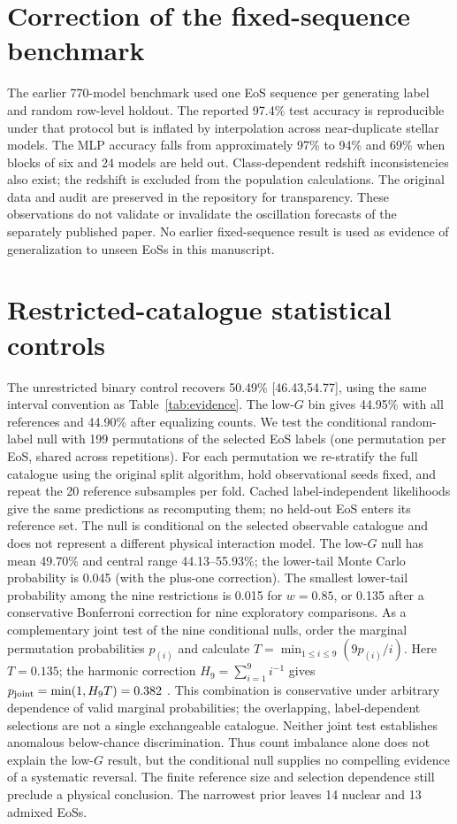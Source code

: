 \documentclass[11pt,a4paper]{article}
\begin{document}
\section{Correction of the fixed-sequence benchmark}\label{sec:legacy}
The earlier 770-model benchmark used one EoS sequence per generating label and random row-level holdout. The reported 97.4\% test accuracy is reproducible under that protocol but is inflated by interpolation across near-duplicate stellar models. The MLP accuracy falls from approximately 97\% to 94\% and 69\% when blocks of six and 24 models are held out. Class-dependent redshift inconsistencies also exist; the redshift is excluded from the population calculations. The original data and audit are preserved in the repository for transparency. These observations do not validate or invalidate the oscillation forecasts of the separately published paper. No earlier fixed-sequence result is used as evidence of generalization to unseen EoSs in this manuscript.
\section{Restricted-catalogue statistical controls}\label{sec:controls}
The unrestricted binary control recovers 50.49\% [46.43,54.77], using the same interval convention as Table~\ref{tab:evidence}. The low-$G$ bin gives 44.95\% with all references and 44.90\% after equalizing counts. We test the conditional random-label null with 199 permutations of the selected EoS labels (one permutation per EoS, shared across repetitions). For each permutation we re-stratify the full catalogue using the original split algorithm, hold observational seeds fixed, and repeat the 20 reference subsamples per fold. Cached label-independent likelihoods give the same predictions as recomputing them; no held-out EoS enters its reference set. The null is conditional on the selected observable catalogue and does not represent a different physical interaction model. The low-$G$ null has mean 49.70\% and central range 44.13--55.93\%; the lower-tail Monte Carlo probability is 0.045 (with the plus-one correction). The smallest lower-tail probability among the nine restrictions is 0.015 for $w=0.85$, or 0.135 after a conservative Bonferroni correction for nine exploratory comparisons. As a complementary joint test of the nine conditional nulls, order the marginal permutation probabilities $p_{(i)}$ and calculate $T=\min_{1\le i\le9}(9p_{(i)}/i)$. Here $T=0.135$; the harmonic correction $H_9=\sum_{i=1}^9 i^{-1}$ gives $p_{\rm joint}=\min(1,H_9T)=0.382$ \citep{Hommel83}. This combination is conservative under arbitrary dependence of valid marginal probabilities; the overlapping, label-dependent selections are not a single exchangeable catalogue. Neither joint test establishes anomalous below-chance discrimination. Thus count imbalance alone does not explain the low-$G$ result, but the conditional null supplies no compelling evidence of a systematic reversal. The finite reference size and selection dependence still preclude a physical conclusion. The narrowest prior leaves 14 nuclear and 13 admixed EoSs.
\end{document}
